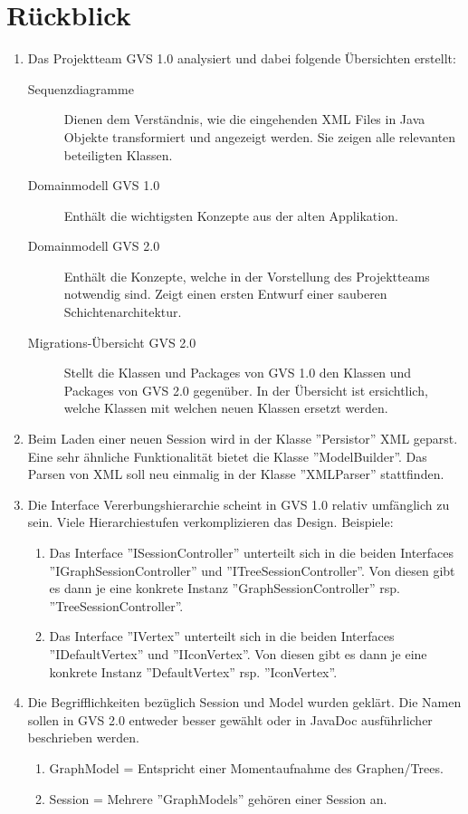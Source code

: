 \documentclass[11pt, a4paper,oneside]{scrartcl}
\begin{document}
\section{Rückblick}
\begin{enumerate}
	\item Das Projektteam GVS 1.0 analysiert und dabei folgende Übersichten erstellt:
	\begin{description}
		\item[Sequenzdiagramme] Dienen dem Verständnis, wie die eingehenden XML Files in Java Objekte transformiert und angezeigt werden. Sie zeigen alle relevanten beteiligten Klassen.
		\item[Domainmodell GVS 1.0 ] Enthält die wichtigsten Konzepte aus der alten Applikation.
		\item[Domainmodell GVS 2.0 ] Enthält die Konzepte, welche in der Vorstellung des Projektteams notwendig sind. Zeigt einen ersten Entwurf einer sauberen Schichtenarchitektur.
		\item[Migrations-Übersicht GVS 2.0 ] Stellt die Klassen und Packages von GVS 1.0 den Klassen und Packages von GVS 2.0 gegenüber. In der Übersicht ist ersichtlich, welche Klassen mit welchen neuen Klassen ersetzt werden.
	\end{description}
	\item Beim Laden einer neuen Session wird in der Klasse ''Persistor'' XML geparst. Eine sehr ähnliche Funktionalität bietet die Klasse ''ModelBuilder''. Das Parsen von XML soll neu einmalig in der Klasse ''XMLParser'' stattfinden. 
	\item Die Interface Vererbungshierarchie scheint in GVS 1.0 relativ umfänglich zu sein. Viele Hierarchiestufen verkomplizieren das Design. Beispiele: 
	\begin{enumerate}
		\item Das Interface ''ISessionController'' unterteilt sich in die beiden Interfaces ''IGraphSessionController'' und ''ITreeSessionController''. Von diesen gibt es dann je eine konkrete Instanz ''GraphSessionController'' rsp. ''TreeSessionController''.
		\item Das Interface ''IVertex'' unterteilt sich in die beiden Interfaces ''IDefaultVertex'' und ''IIconVertex''. Von diesen gibt es dann je eine konkrete Instanz ''DefaultVertex'' rsp. ''IconVertex''.
	\end{enumerate}
	\item Die Begrifflichkeiten bezüglich Session und Model wurden geklärt. Die Namen sollen in GVS 2.0 entweder besser gewählt oder in JavaDoc ausführlicher beschrieben werden.
	\begin{enumerate}
		\item GraphModel = Entspricht einer Momentaufnahme des Graphen/Trees.
		\item Session = Mehrere ''GraphModels'' gehören einer Session an.
	\end{enumerate}
\end{enumerate}
\end{document}
